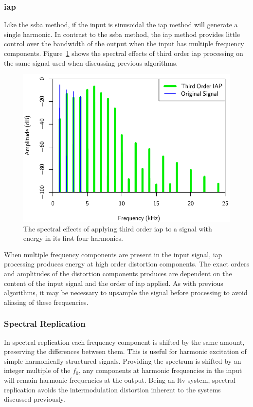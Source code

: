 		\subsubsection*{\acrshort{iap}}
			Like the \acrshort{ssba} method, if the input is sinusoidal the \acrshort{iap} method will generate
			a single harmonic. In contrast to the \acrshort{ssba} method, the \acrshort{iap} method provides
			little control over the bandwidth of the output when the input has multiple frequency components.
			Figure~\ref{fig:IAP3Spectra} shows the spectral effects of third order \acrshort{iap} processing on
			the same signal used when discussing previous algorithms.

			\begin{figure}[h!]
				\centering
				\includegraphics{chapter5/Images/IAP3Spectra.pdf}
				\caption{The spectral effects of applying third order \acrshort{iap} to a signal with
					 energy in its first four harmonics.}
				\label{fig:IAP3Spectra}
			\end{figure}

			When multiple frequency components are present in the input signal, \acrshort{iap} processing
			produces energy at high order distortion components. The exact orders and amplitudes of the
			distortion components produces are dependent on the content of the input signal and the order of
			\acrshort{iap} applied. As with previous algorithms, it may be necessary to upsample the signal
			before processing to avoid aliasing of these frequencies.

		\subsubsection*{Spectral Replication}
			In spectral replication each frequency component is shifted by the same amount, preserving the
			differences between them. This is useful for harmonic excitation of simple harmonically structured
			signals. Providing the spectrum is shifted by an integer multiple of the $f_{0}$, any components at
			harmonic frequencies in the input will remain harmonic frequencies at the output. Being an
			\acrshort{ltv} system, spectral replication avoids the intermodulation distortion inherent to the
			systems discussed previously. 


